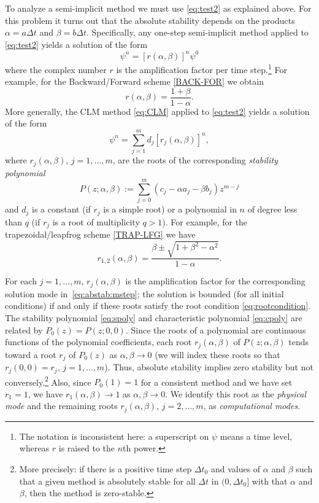 \documentclass[12pt]{article}
\newcommand{\dt}{\Delta t}
\begin{document}
To analyze a semi-implicit method we must use \eqref{eq:test2} as explained
above.  For this problem it turns out that the absolute stability depends on
the products $\alpha=a\dt$ and $\beta=b\dt$.  Specifically, any one-step
semi-implicit method applied to \eqref{eq:test2} yields a solution of the form
\begin{equation}
  \psi^n = [r(\alpha,\beta)]^n \psi^0
\label{eq:abstab:onestep}
\end{equation}
where the complex number $r$ is the amplification factor per time 
step.\footnote{The notation is
inconsistent here:  a superscript on $\psi$ means a time level, whereas $r$ is
raised to the $n$th power.} For example, for the Backward/Forward scheme
\eqref{BACK-FOR} we obtain
\begin{equation}
  r(\alpha,\beta) = \frac{1+\beta}{1-\alpha} .
\label{BAC-FOR:amp}
\end{equation}
More generally, the CLM method \eqref{eq:CLM} applied to \eqref{eq:test2} 
yields a solution of the form
\begin{equation}
  \psi^n = \sum_{j=1}^m d_j[r_j(\alpha,\beta)]^n ,
\label{eq:abstab:mstep}
\end{equation}
where $r_j(\alpha,\beta)$, $j=1,\dots,m$, are the roots of the corresponding
\emph{stability polynomial}
\begin{equation}
  P(z;\alpha,\beta) := \sum_{j=0}^{m} \left(c_j-\alpha a_j - \beta b_j\right)
  z^{m-j} 
\label{eq:cpoly}
\end{equation}
and $d_j$ is a constant (if $r_j$ is a simple root) or a polynomial in $n$ 
of degree less than $q$ (if $r_j$ is a root of multiplicity $q>1$).
For example, for the trapezoidal/leapfrog scheme \eqref{TRAP-LFG} we have
\begin{equation}
  r_{1,2}(\alpha,\beta) = 
    \frac{\beta\pm\sqrt{1 + \beta^2 - \alpha^2}}{1-\alpha} .
\label{TRAP-LFG:amp}
\end{equation}

For each $j=1,\dots,m$, $r_j(\alpha,\beta)$ is the amplification factor for
the corresponding solution mode in~\eqref{eq:abstab:mstep}; the solution is
bounded (for all initial conditions) if and only if these roots satisfy the
root condition \eqref{eq:rootcondition}.  The stability polynomial
\eqref{eq:spoly} and characteristic polynomial \eqref{eq:cpoly} are related by
$P_0(z)=P(z;0,0)$.  Since the roots of a polynomial are continuous functions
of the polynomial coefficients, each root $r_j(\alpha,\beta)$ of
$P(z;\alpha,\beta)$ tends toward a root $r_j$ of $P_0(z)$ as
$\alpha,\beta\to0$ (we will index these roots so that $r_j(0,0)=r_j$,
$j=1,\dots,m$).  Thus, absolute stability implies zero stability but not
conversely.\footnote{More precisely:  if there is a positive time step $\dt_0$
and values of $\alpha$ and $\beta$ such that a given method is absolutely
stable for all $\dt$ in $(0,\dt_0]$ with that $\alpha$ and $\beta$, then the
method is zero-stable.} Also, since $P_0(1)=1$ for a consistent method and we
have set $r_1=1$, we have $r_1(\alpha,\beta)\to1$ as $\alpha,\beta\to0$.  We
identify this root as the \emph{physical mode} and the remaining roots
$r_j(\alpha,\beta)$, $j=2,\dots,m$, as \emph{computational modes}. 
\end{document}
